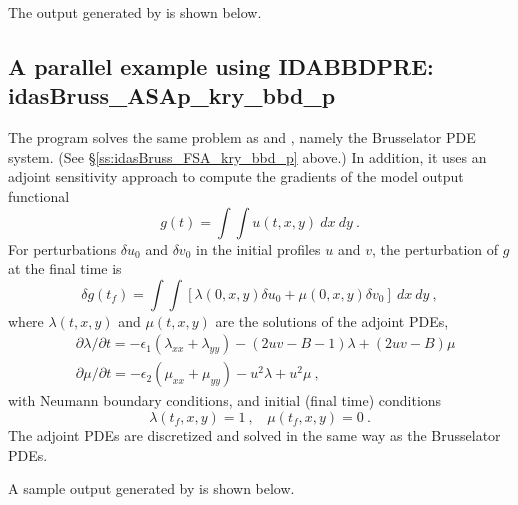 The output generated by  is shown below.




\subsection{A parallel example using IDABBDPRE: idasBruss\_ASAp\_kry\_bbd\_p}
\label{ss:idasBruss_ASAp_kry_bbd_p}

The  program solves the same problem as
 and , namely the
Brusselator PDE system.  (See \S\ref{ss:idasBruss_FSA_kry_bbd_p} above.)
In addition, it uses an adjoint sensitivity approach to compute the
gradients of the model output functional
\begin{equation*}
  g(t) = \int \int u(t,x,y)~dx~dy ~.
\end{equation*}
For perturbations $\delta u_0$ and $\delta v_0$ in the initial profiles
$u$ and $v$, the perturbation of $g$ at the final time is
\begin{equation*}
  \delta g(t_f) = \int \int [\lambda(0,x,y) \delta u_0 + \mu(0,x,y) \delta v_0] ~dx~dy ~,
\end{equation*}
where $\lambda(t,x,y)$ and $\mu(t,x,y)$ are the solutions of the adjoint PDEs,
\begin{equation*}
\begin{split}
  &\partial \lambda / \partial t = -\epsilon_1 (\lambda_{xx} + \lambda_{yy})
                              - (2 u v - B - 1) \lambda + (2 u v - B) \mu \\
  &\partial \mu / \partial t = -\epsilon_2 (\mu_{xx} + \mu_{yy})
                              - u^2 \lambda + u^2 \mu ~,
\end{split}
\end{equation*}
with Neumann boundary conditions, and initial (final time) conditions
\begin{equation*}
  \lambda (t_f,x,y) = 1 ~, ~~~~ \mu (t_f,x,y) =  0 ~.
\end{equation*}
The adjoint PDEs are discretized and solved in the same way as the
Brusselator PDEs.

A sample output generated by  is shown below.



